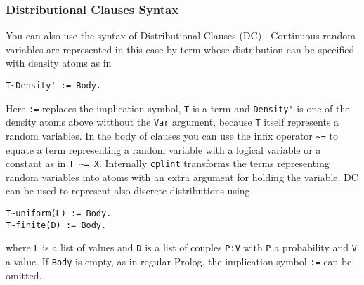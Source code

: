 \subsubsection{Distributional Clauses Syntax}
\label{dc}
You can also use the syntax of Distributional Clauses (DC) \cite{Nitti2016}.
Continuous random variables are represented in this case by term whose distribution can be specified with density atoms as in
\begin{verbatim}
T~Density' := Body.
\end{verbatim}
Here \verb|:=| replaces the implication symbol, \verb|T| is a term and \verb|Density'| is one of the density atoms above witthout the \verb|Var| argument, because \verb|T|
itself represents a random variables. In the body of clauses you can use the infix operator \verb|~=| to equate a term representing a random variable with a logical variable or
a constant as in \verb|T ~= X|. Internally \verb|cplint| transforms the terms representing random variables into atoms with an extra argument for holding the variable.
DC can be used to represent also discrete distributions using
\begin{verbatim}
T~uniform(L) := Body.
T~finite(D) := Body.
\end{verbatim} 
where \verb|L| is a list of values and \verb|D| is a list of couples \verb|P:V| with \verb|P| a probability and \verb|V| a value.
If \verb|Body| is empty, as in regular Prolog, the implication symbol \verb|:=| can be omitted.

